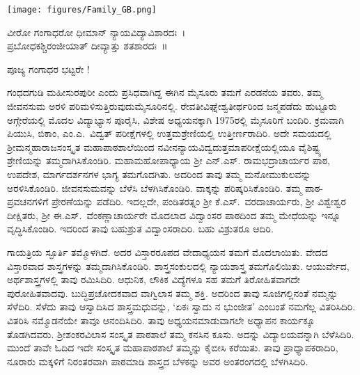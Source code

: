 {\fontsize{14}{16}\selectfont
\thispagestyle{plain}
{\fboxsep=10pt
\centerline{}
\vskip 1cm
}
\centerline{\texttt{[image: figures/Family\_GB.png]}}

\begin{center}
ವೀರೋ ಗಂಗಾಧರೋ ಧೀಮಾನ್ ನ್ಯಾಯವಿದ್ಯಾವಿಶಾರದಃ~।\\
ಪ್ರಬೋಧಕಶ್ಚಿರಂಜೀಯಾತ್ ದೀವ್ಯಾತ್ತು ಶತಶಾರದಃ~॥
\end{center}

ಪೂಜ್ಯ ಗಂಗಾಧರ ಭಟ್ಟರೇ !

ಗಂಧದಗುಡಿ ಮಹೀಸುರಪುರೀ ಎಂದು ಪ್ರಸಿಧವಾಗಿದ್ದ ಈಗಿನ ಮೈಸೂರು ತಮಗೆ ಎರಡನೆಯ ತವರು. ತಮ್ಮ ಜೀವನಸುಮ ಅರಳಿ ಪರಿಮಳಿಸುತ್ತಿರುವುದು\break ಮೈಸೂರಿ\-ನಲ್ಲಿ. ರೇವತೀವಿಘ್ನೇಶ್ವತೀರ್ಥರಿಂದ ಜನ್ಮಪಡೆದು ಹುಟ್ಟೂರು ಅಗ್ಗೇರೆಯಲ್ಲಿ ಮೊದಲ ವಿದ್ಯಾಭ್ಯಾಸ ಪೂರೈಸಿ, ವಿಶೇಷ ಅಧ್ಯಯನಕ್ಕಾಗಿ 1975ರಲ್ಲಿ ಮೈಸೂರಿಗೆ ಬಂದಿರಿ. ಕ್ರಮವಾಗಿ ಪಿಯುಸಿ, ಬಿಕಾಂ, ಎಂ.ಎ.\ ವಿದ್ವತ್ ಪರೀಕ್ಷೆಗಳಲ್ಲಿ ಉತ್ತಮಶ್ರೇಣಿ\-ಯಲ್ಲಿ ಉತ್ತೀರ್ಣರಾದಿರಿ. ಅದೇ ಸಮಯದಲ್ಲಿ ಶ್ರೀಮನ್ಮಹಾರಾಜಸಂಸ್ಕೃತ ಮಹಾ\-ಪಾಠಶಾಲೆಯಿಂದ ನವೀನನ್ಯಾಯವಿದ್ವದುತ್ತಮಾಪರೀಕ್ಷೆಯಲ್ಲಿಯೂ ವೈಶಿಷ್ಟ್ಯ ಶ್ರೇಣಿ\-ಯನ್ನು ತಮ್ಮದಾಗಿಸಿಕೊಂಡಿರಿ. ಮಹಾಮಹೋಪಾಧ್ಯಾಯ ಶ್ರೀ ಎನ್.ಎಸ್. ರಾಮ\-ಭದ್ರಾಚಾರ್ಯರ ಪಾಠ, ಉಪದೇಶ, ಮಾರ್ಗದರ್ಶನಗಳ ಭಾಗ್ಯ ತಮಗೊದಗಿತು. ಅದರಿಂದ ತಾವು ತಮ್ಮ ಮನೋಮುಕುಲವನ್ನು ಅರಳಿಸಿಕೊಂಡಿರಿ. ಜೀವನಸುಮವನ್ನು ಬೆಳೆಸಿ ಬೆಳಗಿಸಿಕೊಂಡಿರಿ. ವಾಕ್ಕನ್ನು ಪರಿಷ್ಕರಿಸಿಕೊಂಡಿರಿ. ತಮ್ಮ ಪಾಠ-ಪ್ರವಚನಗಳಿಗೆ ಪ್ರೇರಣೆಯನ್ನು ಪಡೆದಿರಿ. ಇದಲ್ಲದೇ, ಪಂಡಿತರತ್ನಂ ಶ್ರೀ ಕೆ.ಎಸ್.\ \hbox{ವರದಾಚಾರ್ಯರು}, ಶ್ರೀ ವಿಶ್ವೇಶ್ವರ ದೀಕ್ಷಿತರು, ಶ್ರೀ ಈ.ಎಸ್.\ ವೆಂಕಣ್ಣಾಚಾರ್ಯರೇ ಮೊದಲಾದ ವಿದ್ವಾಂಸರ ಪಾಠದಿಂದ ತಮ್ಮ ಮೇಧೆಯನ್ನು ಇನ್ನೂ ವೃದ್ಧಿಸಿಕೊಂಡಿರಿ. ಇದರಿಂದ ತಾವು ಬಹುಶ್ರುತ ವಿದ್ವಾಂಸರಾದಿರಿ. ಬಹು ವಿಶ್ರುತರೂ ಆದಿರಿ.

ಗಾಯತ್ರಿಯ ಸ್ಫೂರ್ತಿ ತಮ್ಮೊಳಗಿದೆ. ಅದರ ವಿಸ್ತಾರರೂಪದ ವೇದಾಧ್ಯಯನ ತಮಗೆ ಮೊದಲಾಯಿತು. ವೇದದ ವಿಸ್ತಾರವಾದ ಶಾಸ್ತ್ರಗಳನ್ನು ತಮ್ಮದಾಗಿಸಿಕೊಂಡಿರಿ. ಶಾಸ್ತ್ರಸಂಕುಲದಲ್ಲಿ ನ್ಯಾಯಶಾಸ್ತ್ರ ತಮಗೊಲಿಯಿತು. ಆಯುರ್ವೇದ, ಅರ್ಥಶಾಸ್ತ್ರ\-ಗಳಲ್ಲಿ ತಾವು ರಮಿಸಿದಿರಿ. ಆಧುನಿಕ, ಲೌಕಿಕ ವಿದ್ಯೆ\-ಗಳೂ ಸಹ ತಮಗೆ ತಿರೋಹಿತವಾಗದೇ ಪುರೋಹಿತವಾದವು. ಬುದ್ಧಿಪ್ರಚೋದಕವಾದ ವಾಗ್ವಿಲಾಸ ತಮ್ಮ ಶಕ್ತಿ. ಅದರಿಂದ ತಾವು ಸೂಜಿಗಲ್ಲಿನಂತೆ ನಮ್ಮನ್ನು ಸೆಳೆದಿರಿ. ಸೆಳೆದು ತಾವು ಆಸ್ವಾದಿಸಿದ ಶಾಸ್ತ್ರಮಧುವನ್ನು,  ‘ಏಕಃ ಸ್ವಾದು ನ ಭುಂಜೀತ’ ಎಂಬಂತೆ ನಮಗೆಲ್ಲ ವಿತರಿಸಿದಿರಿ. ವಿತರಿಸಿ ನಮ್ಮೊಡನೆಯೇ ತಾವೂ ಆನಂದಿಸಿದಿರಿ. ತಾವು ಅಧ್ಯಯನಮಾಡುವಾಗಲೇ ಅಧ್ಯಾಪನ ಕಾರ್ಯಕ್ಕೂ ತೊಡಗಿದವರು. ಶ್ರೀಶಂಕರವಿಲಾಸ ಸಂಸ್ಕೃತ ಪಾಠಶಾಲೆ ತಮ್ಮ ಕನಸಿನ ಕೂಸು. ಅದನ್ನು ವಿದ್ಯಾಲಯ\-ವನ್ನಾಗಿ ಬೆಳೆಸಿದಿರಿ. ಮುಂದೆ ತಾವೇ ಓದಿದ ಇದೇ ಸಂಸ್ಕೃತ ಮಹಾಪಾಠಶಾಲೆ ತಮ್ಮನ್ನು ಕೈಬೀಸಿ ಕರೆಯಿತು. ತಾವು ಪ್ರಾಧ್ಯಾಪಕರಾದಿರಿ, ನೂರಾರು ಮಕ್ಕಳಿಗೆ ನಿರಂತರವಾಗಿ ಪಾಠಮಾಡಿ ಶಾಸ್ತ್ರದ ಬೆಳಕನ್ನು ಅವರ ಅಂತರಂಗದಲ್ಲಿ ಬೆಳಗಿಸಿದಿರಿ. 

}
